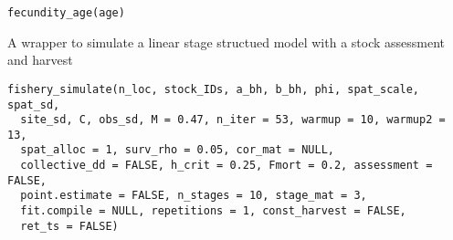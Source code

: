 \documentclass[letterpaper]{book}
\begin{document}
%
\begin{Usage}
\begin{verbatim}
fecundity_age(age)
\end{verbatim}
\end{Usage}
%
\begin{Description}\relax
A wrapper to simulate a linear stage structued model with a stock assessment and harvest
\end{Description}
%
\begin{Usage}
\begin{verbatim}
fishery_simulate(n_loc, stock_IDs, a_bh, b_bh, phi, spat_scale, spat_sd,
  site_sd, C, obs_sd, M = 0.47, n_iter = 53, warmup = 10, warmup2 = 13,
  spat_alloc = 1, surv_rho = 0.05, cor_mat = NULL,
  collective_dd = FALSE, h_crit = 0.25, Fmort = 0.2, assessment = FALSE,
  point.estimate = FALSE, n_stages = 10, stage_mat = 3,
  fit.compile = NULL, repetitions = 1, const_harvest = FALSE,
  ret_ts = FALSE)
\end{verbatim}
\end{Usage}
%
\end{document}
